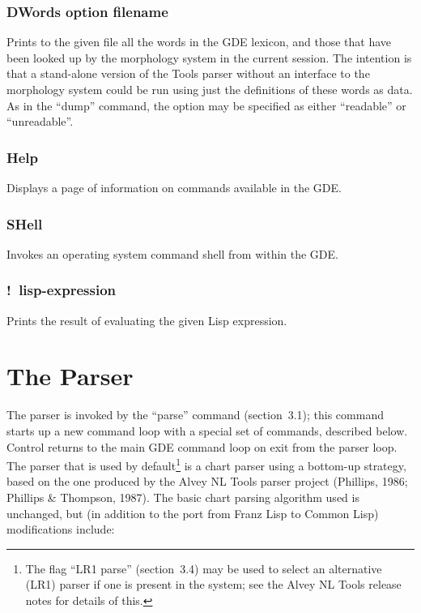 \subsection{DWords option filename}

Prints to the given file all the words in the GDE lexicon, and those
that have been looked up by the morphology system in the current session.
The intention is that a stand-alone version of the Tools parser
without an interface to the morphology system could be run using just
the definitions of these words as data. As in the ``dump'' command, the
option may be specified as either ``readable'' or ``unreadable''.

\subsection{Help}

Displays a page of information on commands available in the GDE.

\subsection{SHell}

Invokes an operating system command shell from within the GDE.

\subsection{!\ lisp-expression}

Prints the result of evaluating the given Lisp expression.


\chapter{The Parser}

The parser is invoked by the ``parse'' command (section~3.1); this command
starts up a new command loop with a special set of commands, described below.
Control returns to the main GDE command loop on exit from the parser loop.
The parser that is used by default\footnote{The flag ``LR1 parse'' (section~3.4)
may be used to select an alternative (LR1) parser if one is present in the system;
see the Alvey NL Tools release notes for details of this.}
is a chart parser using a bottom-up strategy, based on the one produced by the
Alvey NL Tools parser project (Phillips, 1986; Phillips \& Thompson, 1987).
The basic chart parsing algorithm used is unchanged, but (in addition to the port
from Franz Lisp to Common Lisp) modifications include:

